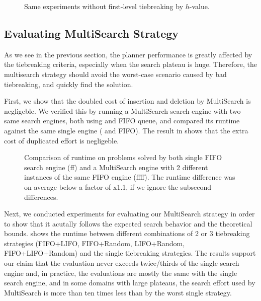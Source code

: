 \begin{figure}[htb]
 \centering
 
 \caption{Same experiments without first-level tiebreaking by $h$-value.}
 \label{depth-noh}
\end{figure}


\subsection{Evaluating MultiSearch Strategy}

As we see in the previous section, the planner performance is greatly
affected by the tiebreaking criteria, especially when the search plateau
is huge. Therefore, the multisearch strategy should avoid the
worst-case scenario caused by bad tiebreaking, and quickly find the solution.

First, we show that the doubled cost of insertion and deletion by
MultiSearch is negligeble.  We verified this by running a MultiSearch
search engine with two same search engines, both using \lmcut and FIFO
queue, and compared its runtime against the same single engine (\lmcut
and FIFO). The result in  shows that the extra cost of
duplicated effort is negligeble.

\begin{figure}[htbp]
 \centering
 \caption{Comparison of runtime on problems solved by both single FIFO search engine (ff) and a MultiSearch engine with 2 different instances of the same FIFO engine (ffff). The runtime difference was on average below a factor of x1.1, if we ignore the subsecond differences.}
 \label{ffff}
\end{figure}

Next, we conducted experiments for evaluating our MultiSearch
strategy in order to show that it acutally follows the expected search
behavior and the theoretical bounds.
 shows the runtime between
different combinations of 2 or 3 tiebreaking strategies (FIFO+LIFO,
FIFO+Random, LIFO+Random, FIFO+LIFO+Random) and the single tiebreaking
strategies. The results support our claim that the evaluation never
exceeds twice/thirds of the single search engine and, in practice, the
evaluations are mostly the same with the single search engine, and in
some domains with large plateaus, the search effort used by MultiSearch
is more than ten times less than by the worst single strategy.



